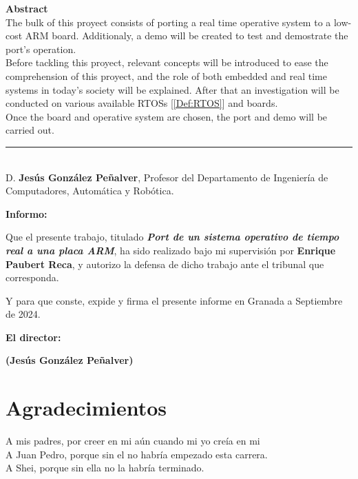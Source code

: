 \noindent\textbf{Abstract}\\

The bulk of this proyect consists of porting a real time operative system to a low-cost ARM board. Additionaly, a demo will be created to test and demostrate the port's operation.\\

Before tackling this proyect, relevant concepts will be introduced to ease the comprehension of this proyect, and the role of both embedded and real time systems in today's society will be explained. After that an investigation will be conducted on various available RTOSs [\ref{Def:RTOS}] and boards.\\

Once the board and operative system are chosen, the port and demo will be carried out.\\

\cleardoublepage

\thispagestyle{empty}

\noindent\rule[-1ex]{\textwidth}{2pt}\\[4.5ex]

D. \textbf{Jesús González Peñalver}, Profesor del Departamento de Ingeniería de Computadores, Automática y Robótica.

\vspace{0.5cm}

\textbf{Informo:}

\vspace{0.5cm}

Que el presente trabajo, titulado \textit{\textbf{Port de un sistema operativo de tiempo real a una placa ARM}},
ha sido realizado bajo mi supervisión por \textbf{Enrique Paubert Reca}, y autorizo la defensa de dicho trabajo ante el tribunal
que corresponda.

\vspace{0.5cm}

Y para que conste, expide y firma el presente informe en Granada a Septiembre de 2024.

\vspace{1cm}

\textbf{El director: }

\vspace{5cm}

\noindent \textbf{(Jesús González Peñalver)}

\chapter*{Agradecimientos}

A mis padres, por creer en mi aún cuando mi yo creía en mi\\

A Juan Pedro, porque sin el no habría empezado esta carrera.\\

A Shei, porque sin ella no la habría terminado.\\
